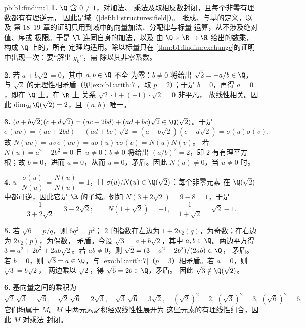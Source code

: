 \begin{solution}{pb:b1:findim:1}
\textbf{1.} $\Q$ 含 $0 \neq 1$，对加法、
乘法及取相反数封闭，且每个非零有理数都有有理逆元，
因此是域（\cref{def:b1:structures:field}）。
张成、与基的定义，以及
第 18--19 章的证明只用到域中的向量加法、分配律与标量
运算，从不涉及绝对值、序或
极限。于是 $\R$ 连同自身的加法，以及
由 $\Q \times \R \to \R$ 给出的数乘，构成 $\Q$ 上的，所有
定理均适用。除以标量只在
\cref{thm:b1:findim:exchange}的证明中出现一次：要“解出 $g_k$”，需
除以其非零系数。

\textbf{2.} 若 $a + b\sqrt2 = 0$，其中 $a, b \in \Q$ 不全
为零：$b \neq 0$ 将给出 $\sqrt2 = -a/b \in \Q$，与
$\sqrt2$ 的无理性相矛盾（见\cref{exo:b1:arith:7}，取 $p =
2$）；于是 $b = 0$，再得 $a = 0$，即在 $\Q$ 上。在 $\R$ 上
关系 $\sqrt2\cdot 1 + (-1)\cdot\sqrt2 = 0$ 非平凡，
故线性相关。因此 $\dim_\Q \Q(\sqrt2) = 2$，且
$(a, b)$ 唯一。

\textbf{3.} $(a + b\sqrt2)(c + d\sqrt2) = (ac + 2bd) + (ad +
bc)\sqrt2 \in \Q(\sqrt2)$。于是
\[
\sigma(uv) = (ac + 2bd) - (ad + bc)\sqrt2
= (a - b\sqrt2)(c - d\sqrt2) = \sigma(u)\sigma(v),
\]
故 $N(uv) = uv\,\sigma(uv) = u\sigma(u)\,v\sigma(v) = N(u)N(v)$。
若 $N(u) = a^2 - 2b^2 = 0$ 且 $u \neq 0$：$b \neq 0$ 将给出
$(a/b)^2 = 2$，即 $2$ 有有理平方根；故 $b = 0$，进而 $a
= 0$，从而 $u = 0$，矛盾。因此 $N(u) \neq 0$，当 $u \neq
0$ 时。

\textbf{4.} $u \cdot \dfrac{\sigma(u)}{N(u)} = \dfrac{N(u)}{N(u)}
= 1$，且 $\sigma(u)/N(u) \in \Q(\sqrt2)$：每个非零元素
在 $\Q(\sqrt2)$ 中都可逆，因此它是
$\R$ 的子域。例如 $N(3 + 2\sqrt2) = 9 - 8 = 1$，于是
\[
\frac1{3 + 2\sqrt2} = 3 - 2\sqrt2 ;
\qquad
N(1 + \sqrt2) = -1, \quad
\frac1{1 + \sqrt2} = \sqrt2 - 1 .
\]

\textbf{5.} 若 $\sqrt6 = p/q$，则 $6q^2 = p^2$；
$2$ 的指数在左边为 $1 + 2v_2(q)$，为奇数；在右边为 $2v_2(p)$，为偶数，
矛盾。今设 $\sqrt3 = a + b\sqrt2$，其中
$a, b \in \Q$。两边平方得 $3 = a^2 + 2b^2 + 2ab\sqrt2$。若 $ab
\neq 0$，则 $\sqrt2 = (3 - a^2 - 2b^2)/(2ab) \in \Q$，
矛盾。若 $b = 0$，则 $\sqrt3 = a \in \Q$，与
\cref{exo:b1:arith:7}（$p = 3$）相矛盾。若 $a = 0$，则 $\sqrt3 = b\sqrt2$，
两边乘以 $\sqrt2$，得 $\sqrt6 = 2b \in \Q$，矛盾。
因此 $\sqrt3 \notin \Q(\sqrt2)$。

\textbf{6.} 基向量之间的乘积为
\[
\sqrt2\,\sqrt3 = \sqrt6,\quad
\sqrt2\,\sqrt6 = 2\sqrt3,\quad
\sqrt3\,\sqrt6 = 3\sqrt2,\quad
(\sqrt2)^2 = 2,\ (\sqrt3)^2 = 3,\ (\sqrt6)^2 = 6,
\]
它们均属于 $M$。$M$ 中两元素之积经双线性性展开为
这些元素的有理线性组合，因此 $M$ 对乘法
封闭。


\end{solution}
